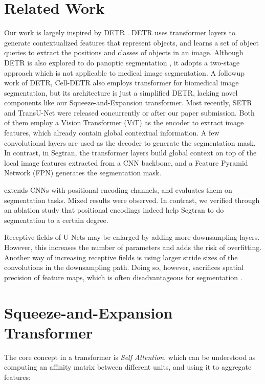\documentclass{article}
\begin{document}
\section{Related Work}
Our work is largely inspired by DETR \cite{detr}. DETR uses transformer layers to generate contextualized features that represent objects, and learns a set of object queries to extract the positions and classes of objects in an image. Although DETR is also explored to do panoptic segmentation \cite{panoptic}, it adopts a two-stage approach which is not applicable to medical image segmentation. A followup work of DETR, Cell-DETR \cite{cell-detr} also employs transformer for biomedical image segmentation, but its architecture is just a simplified DETR, lacking novel components like our Squeeze-and-Expansion transformer. Most recently, SETR \cite{SETR} and TransU-Net \cite{transunet} were released concurrently or after our paper submission. Both of them employ a Vision Transformer (ViT) \cite{vision-trans} as the encoder to extract image features, which already contain global contextual information. A few convolutional layers are used as the decoder to generate the segmentation mask. In contrast, in Segtran, the transformer layers build global context on top of the local image features extracted from a CNN backbone, and a Feature Pyramid Network (FPN) generates the segmentation mask.

\cite{add-pos-to-cnn} extends CNNs with positional encoding channels, and evaluates them on segmentation tasks. Mixed results were observed. In contrast, we verified through an ablation study that positional encodings indeed help Segtran to do segmentation to a certain degree.

Receptive fields of U-Nets may be enlarged by adding more downsampling layers. However, this increases the number of parameters and adds the risk of overfitting. Another way of increasing receptive fields is using larger stride sizes of the convolutions in the downsampling path. Doing so, however, sacrifices spatial precision of feature maps, which is often disadvantageous for segmentation \cite{coarse-features}.



\section{Squeeze-and-Expansion Transformer} \label{s-e-trans}
The core concept in a transformer is \emph{Self Attention}, which can be understood as computing an affinity matrix between different units, and using it to aggregate features:
\end{document}
